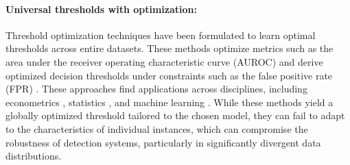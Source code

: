 \paragraph{Universal thresholds with optimization:} Threshold optimization techniques have been formulated to learn optimal thresholds across entire datasets. These methods optimize metrics such as the area under the receiver operating characteristic curve (AUROC) \cite{bradley1997use} and derive optimized decision thresholds under constraints such as the false positive rate (FPR) \cite{krishna2024paraphrasing,lipton2014optimal}. These approaches find applications across disciplines, including econometrics \cite{stavnkova2023threshold}, statistics \cite{esposito2021ghost}, and machine learning \cite{openai2023classifier}. While these methods yield a globally optimized threshold tailored to the chosen model, they can fail to adapt to the characteristics of individual instances, which can compromise the robustness of detection systems, particularly in significantly divergent data distributions.




